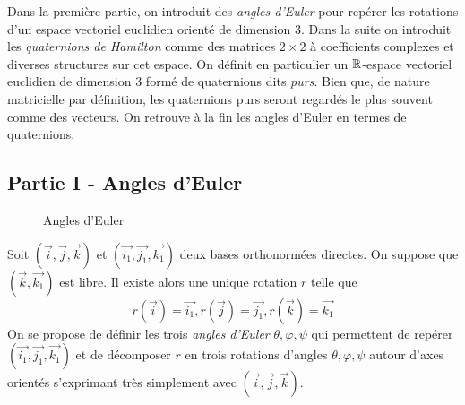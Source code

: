 Dans la première partie, on introduit des \emph{angles d'Euler} pour repérer les rotations d'un espace vectoriel euclidien orienté de dimension 3.\newline 
Dans la suite on introduit les \emph{quaternions de Hamilton} comme des matrices $2\times2$ à coefficients complexes et diverses structures sur cet espace. On définit en particulier un $\mathbb{R}$-espace vectoriel euclidien de dimension $3$ formé de quaternions dits \emph{purs}. Bien que, de nature matricielle par définition, les quaternions purs seront regardés le plus souvent comme des vecteurs. On retrouve à la fin les angles d'Euler en termes de quaternions.

\subsection*{Partie I - Angles d'Euler}
\begin{figure}
   \centering
   
   \caption{Angles d'Euler}
\end{figure}
 Soit $(\overrightarrow{i},\overrightarrow{j},\overrightarrow{k})$ et $(\overrightarrow{i_1},\overrightarrow{j_1},\overrightarrow{k_1})$ deux bases orthonormées directes. On suppose que $(\overrightarrow{k},\overrightarrow{k_1})$ est libre. Il existe alors une unique rotation $r$ telle que
 \[r(\overrightarrow{i})=\overrightarrow{i_1},
 r(\overrightarrow{j})=\overrightarrow{j_1},
 r(\overrightarrow{k})=\overrightarrow{k_1}\]
 On se propose de définir les trois \emph{angles d'Euler} $\theta, \varphi, \psi$ qui permettent de repérer $(\overrightarrow{i_1},\overrightarrow{j_1},\overrightarrow{k_1})$ et de décomposer $r$ en trois rotations d'angles $\theta, \varphi, \psi$ autour d'axes orientés s'exprimant très simplement avec $(\overrightarrow{i},\overrightarrow{j},\overrightarrow{k})$.
 
